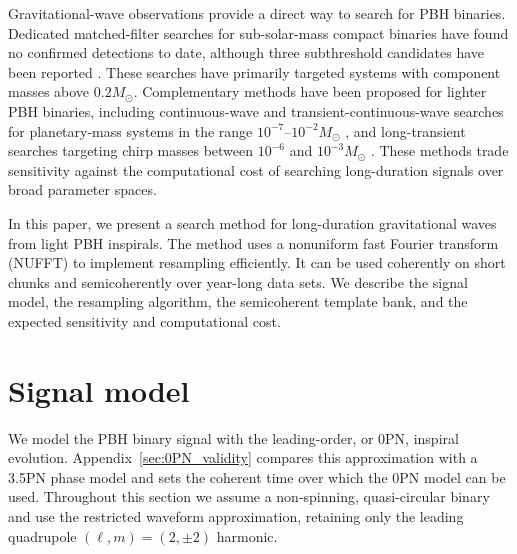 \documentclass[aps,prd,amsmath,floats,floatfix, twocolumn,
superscriptaddress,nofootinbib,showpacs]{revtex4-2}
\begin{document}
Gravitational-wave observations provide a direct way to search for PBH binaries.  Dedicated matched-filter searches for sub-solar-mass compact binaries have found no confirmed detections to date, although three subthreshold candidates have been reported \cite{LIGOScientific:2018glc, LIGOScientific:2019kan, LIGOScientific:2021job, LVK:2022ydq, Phukon:2021cus, Morras:2023jvb, Prunier:2023uoo}.  These searches have primarily targeted systems with component masses above $0.2M_\odot$.  Complementary methods have been proposed for lighter PBH binaries, including continuous-wave and transient-continuous-wave searches for planetary-mass systems in the range $10^{-7}$--$10^{-2}M_\odot$ \cite{Miller:2021knj}, and long-transient searches targeting chirp masses between $10^{-6}$ and $10^{-3}M_\odot$ \cite{Andres-Carcasona:2024jvz}.  These methods trade sensitivity against the computational cost of searching long-duration signals over broad parameter spaces.

In this paper, we present a search method for long-duration gravitational waves from light PBH inspirals.  The method uses a nonuniform fast Fourier transform (NUFFT) to implement resampling efficiently.  It can be used coherently on short chunks and semicoherently over year-long data sets.  We describe the signal model, the resampling algorithm, the semicoherent template bank, and the expected sensitivity and computational cost.


\section{Signal model}
\label{sec:GWs_from_PBHs}
We model the PBH binary signal with the leading-order, or 0PN, inspiral evolution. Appendix~\ref{sec:0PN_validity} compares this approximation with a 3.5PN phase model and sets the coherent time over which the 0PN model can be used. Throughout this section we assume a non-spinning, quasi-circular binary and use the restricted waveform approximation, retaining only the leading quadrupole $(\ell,m)=(2,\pm2)$ harmonic.
\end{document}
